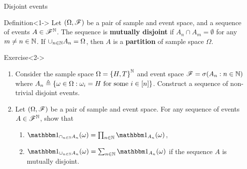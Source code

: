 \documentclass[12pt,aspectratio=169]{beamer}
\begin{document}
\begin{frame}{Disjoint events}
    \begin{block}{Definition}<1->
    Let $(\Omega,\mathscr{F})$ be a pair of sample and event space, 
    and a sequence of events $A \in \mathscr{F}^{\mathbb{N}}$. 
    The sequence is \textbf{mutually disjoint} if $A_n\cap A_m = \emptyset$ for any $m\neq n \in \mathbb{N}$. 
    If $\cup_{n \in \mathbb{N}}A_n = \Omega$, then $A$ is a \textbf{partition} of sample space $\Omega$.   
    \end{block}

    \begin{block}{Exercise}<2->
    \begin{enumerate}
        \item <2-> Consider the sample space $\Omega = \left\{H,T\right\}^{\mathbb{N}}$ and event space $\mathscr{F} = \sigma(A_n: n \in \mathbb{N})$ where $A_n \triangleq \left\{\omega \in \Omega: \omega_i = H \text{ for some } i \in [n]\right\}$. 
        Construct a sequence of non-trivial disjoint events. 
    
        \item <3-> Let $(\Omega,\mathscr{F})$ be a pair of sample and event space. 
        For any sequence of events $A \in \mathscr{F}^{\mathbb{N}}$, show that
        \begin{enumerate}
            \item <4-> $\Ind{\cap_{n\in\N}A_n}(\omega) = \prod_{n \in \N}\Ind{A_n}(\omega)$, 
            \item <5-> $\Ind{\cup_{n \in \N}A_n}(\omega) = \sum_{n \in \N}\Ind{A_n}(\omega)$ if the sequence $A$ is mutually disjoint.   
        \end{enumerate} 
    \end{enumerate}
    \end{block}
\end{frame}
\end{document}
